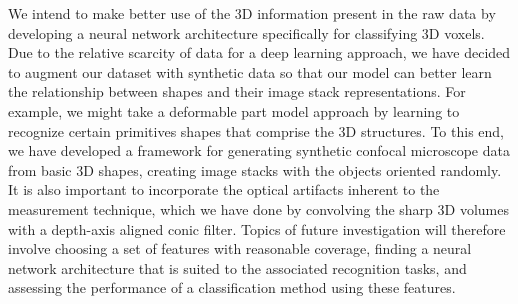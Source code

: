 \documentclass{article}
\begin{document}
We intend to make better use of the 3D information present in the raw data by developing a neural network architecture specifically for classifying 3D voxels. Due to the relative scarcity of data for a deep learning approach, we have decided to augment our dataset with synthetic data so that our model can better learn the relationship between shapes and their image stack representations. For example, we might take a deformable part model approach by learning to recognize certain primitives shapes that comprise the 3D structures. To this end, we have developed a framework for generating synthetic confocal microscope data from basic 3D shapes, creating image stacks with the objects oriented randomly. It is also important to incorporate the optical artifacts inherent to the measurement technique, which we have done by convolving the sharp 3D volumes with a depth-axis aligned conic filter. Topics of future investigation will therefore involve choosing a set of features with reasonable coverage, finding a neural network architecture that is suited to the associated recognition tasks, and assessing the performance of a classification method using these features.



\end{document}
